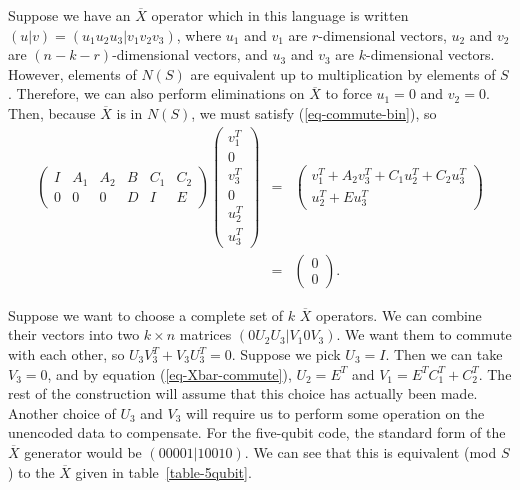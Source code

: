 \documentclass{report}
\newcommand{\Xbar}{\overline{X}}
\begin{document}
Suppose we have an $\Xbar$ operator which in this language is written 
$(u|v) = (u_1 u_2 u_3| v_1 v_2 v_3)$, where $u_1$ and $v_1$ are 
$r$-dimensional vectors, $u_2$ and $v_2$ are $(n-k-r)$-dimensional 
vectors, and $u_3$ and $v_3$ are $k$-dimensional vectors.  However, 
elements of $N(S)$ are equivalent up to multiplication by elements of $S$.  
Therefore, we can also perform eliminations on $\Xbar$ to force $u_1 = 0$ 
and $v_2 = 0$.  Then, because $\Xbar$ is in $N(S)$, we must satisfy
(\ref{eq-commute-bin}), so
\begin{eqnarray}
\left( \begin{array}{cccccc}
I & A_1 & A_2 & B & C_1 & C_2 \\
0 & 0 & 0 & D & I & E
\end{array} \right)
\left( \begin{array}{c} v_1^T \\ 0 \\ v_3^T \\ 0 \\ u_2^T \\ u_3^T 
\end{array} \right)
& \!\!\! = & \!\!\! \left( \begin{array}{c}
 v_1^T + A_2 v_3^T + C_1 u_2^T + C_2 u_3^T \\
u_2^T + E u_3^T
\end{array} \right) \nonumber \\
& \!\!\! = & \!\!\! \left( \begin{array}{c} 0 \\ 0 \end{array} \right).
\label{eq-Xbar-commute}
\end{eqnarray}

Suppose we want to choose a complete set of $k$ $\Xbar$ operators.  We 
can combine their vectors into two $k \times n$ matrices $(0 U_2 U_3 | 
V_1 0 V_3)$.  We want them to commute with each other, so $U_3 V_3^T + 
V_3 U_3^T = 0$.  Suppose we pick $U_3 = I$.  Then we can take $V_3 = 0$, and 
by equation (\ref{eq-Xbar-commute}), $U_2 = E^T$ and $V_1 = E^T C_1^T + C_2^T$. 
The rest of the construction will assume that this choice has actually been 
made.  Another choice of $U_3$ and $V_3$ will require us to perform some 
operation on the unencoded data to compensate.  For the five-qubit code, the 
standard form of the $\Xbar$ generator would be $(0 0 0 0 1 | 1 0 0 1 0)$.  
We can see that this is equivalent (mod $S$) to the $\Xbar$ given in 
table~\ref{table-5qubit}.
\end{document}
